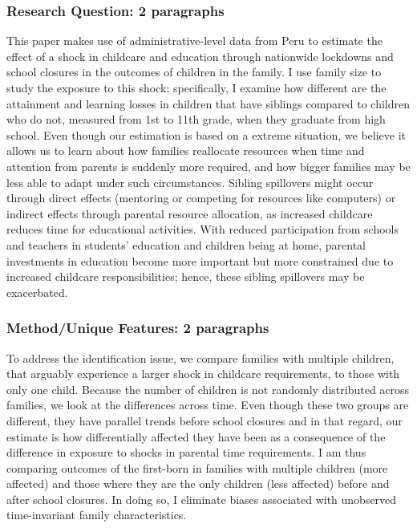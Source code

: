 



\subsubsection{Research Question: 2 paragraphs}

This paper makes use of administrative-level data from Peru to estimate the effect of a shock in childcare and education through nationwide lockdowns and school closures in the outcomes of children in the family. I use family size to study the exposure to this shock; specifically, I examine how different are the attainment and learning losses in children that have siblings compared to children who do not, measured from 1st to 11th grade, when they graduate from high school. Even though our estimation is based on a extreme situation, we believe it allows us to learn about how families reallocate resources when time and attention from parents is suddenly more required, and how bigger families may be less able to adapt under such circumstances. Sibling spillovers might occur through direct effects (mentoring or competing for resources like computers) or indirect effects through parental resource allocation, as increased childcare reduces time for educational activities. With reduced participation from schools and teachers in students’ education and children being at home, parental investments in education become more important but more constrained due to increased childcare responsibilities; hence, these sibling spillovers may be exacerbated. 



\subsubsection{Method/Unique Features: 2 paragraphs}

To address the identification issue, we compare families with multiple children, that arguably experience a larger shock in childcare requirements, to those with only one child. Because the number of children is not randomly distributed across families, we look at the differences across time.  Even though these two groups are different, they have parallel trends before school closures and in that regard, our estimate is how differentially affected they have been as a consequence of the difference in exposure to shocks in parental time requirements. I am thus comparing outcomes of the first-born in families with multiple children (more affected) and those where they are the only children (less affected) before and after school closures. In doing so, I eliminate biases associated with unobserved time-invariant family characteristics.

